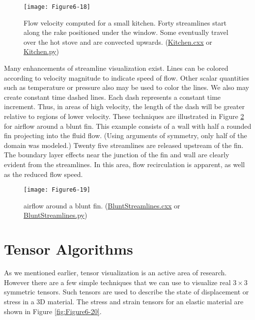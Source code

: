 \begin{figure}[htb]
	\texttt{[image: Figure6-18]}
	\caption{Flow velocity computed for a small kitchen. Forty streamlines start along the rake positioned under the window. Some eventually travel over the hot stove and are convected upwards. (\href{https://lorensen.github.io/VTKExamples/site/Cxx/Visualization/Kitchen}{Kitchen.cxx} or \href{https://lorensen.github.io/VTKExamples/site/Python/Visualization/Kitchen/}{Kitchen.py})}\label{fig:Figure6-18}
\end{figure}

Many enhancements of streamline visualization exist. Lines can be colored according to velocity magnitude to indicate speed of flow. Other scalar quantities such as temperature or pressure also may be used to color the lines. We also may create constant time dashed lines. Each dash represents a constant time increment. Thus, in areas of high velocity, the length of the dash will be greater relative to regions of lower velocity. These techniques are illustrated in Figure \ref{fig:Figure6-19} for airflow around a blunt fin. This example consists of a wall with half a rounded fin projecting into the fluid flow. (Using arguments of symmetry, only half of the domain was modeled.) Twenty five streamlines are released upstream of the fin. The boundary layer effects near the junction of the fin and wall are clearly evident from the streamlines. In this area, flow recirculation is apparent, as well as the reduced flow speed.

\begin{figure}[htb]
	\texttt{[image: Figure6-19]}
	\caption{airflow around a blunt fin. (\href{https://lorensen.github.io/VTKExamples/site/Cxx/VisualizationAlgorithms/BluntStreamlines}{BluntStreamlines.cxx} or \href{https://lorensen.github.io/VTKExamples/site/Python/VisualizationAlgorithms/BluntStreamlines/}{BluntStreamlines.py})}\label{fig:Figure6-19}
\end{figure}


\section{Tensor Algorithms}

As we mentioned earlier, tensor visualization is an active area of research. However there are a few simple techniques that we can use to visualize real $3 \times 3$ symmetric tensors. Such tensors are used to describe the state of displacement or stress in a 3D material. The stress and strain tensors for an elastic material are shown in Figure \ref{fig:Figure6-20}.

